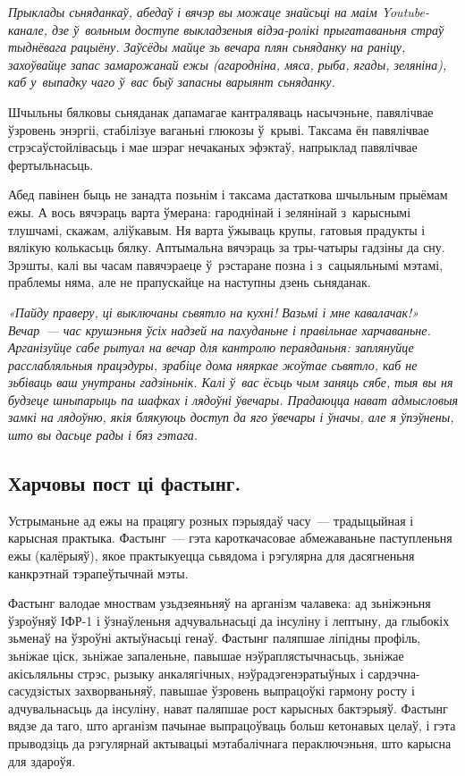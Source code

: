 \emph{Прыклады сьняданкаў, абедаў і вячэр вы можаце знайсьці на маім Youtube-канале, дзе ў~вольным доступе выкладзеныя відэа-ролікі прыгатаваньня страў тыднёвага рацыёну. Заўсёды майце зь вечара плян сьняданку на раніцу, захоўвайце запас замарожанай ежы (агародніна, мяса, рыба, ягады, зеляніна), каб у~выпадку чаго ў~вас быў запасны варыянт сьняданку.}

Шчыльны бялковы сьняданак дапамагае кантраляваць насычэньне, павялічвае ўзровень энэргіі, стабілізуе ваганьні глюкозы ў~крыві. Таксама ён павялічвае стрэсаўстойлівасьць і мае шэраг нечаканых эфэктаў, напрыклад павялічвае фертыльнасьць. 


Абед павінен быць не занадта позьнім і таксама дастаткова шчыльным прыёмам ежы. А вось вячэраць варта ўмерана: гароднінай і зелянінай з~карыснымі тлушчамі, скажам, аліўкавым. Ня варта ўжываць крупы, гатовыя прадукты і вялікую колькасьць бялку. Аптымальна вячэраць за тры-чатыры гадзіны да сну. Зрэшты, калі вы часам павячэраеце ў~рэстаране позна і з~сацыяльнымі мэтамі, праблемы няма, але не прапускайце на наступны дзень сьняданак. 

\emph{«Пайду праверу, ці выключаны сьвятло на кухні! Вазьмі і мне кавалачак!» Вечар~--- час крушэньня ўсіх надзей на пахуданьне і правільнае харчаваньне. Арганізуйце сабе рытуал на вечар для кантролю пераяданьня: заплянуйце расслабляльныя працэдуры, зрабіце дома няяркае жоўтае сьвятло, каб не зьбіваць ваш унутраны гадзіньнік. Калі ў~вас ёсьць чым заняць сябе, тыя вы ня будзеце шныпарыць па шафках і лядоўні ўвечары. Прадаюцца нават адмысловыя замкі на лядоўню, якія блякуюць доступ да яго ўвечары і ўначы, але я ўпэўнены, што вы дасьце рады і бяз гэтага.}

\subsection*{Харчовы пост ці фастынг.}
Устрыманьне ад ежы на працягу розных пэрыядаў часу~--- традыцыйная і карысная практыка. Фастынг~--- гэта кароткачасовае абмежаваньне паступленьня ежы (калёрыяў), якое практыкуецца сьвядома і рэгулярна для дасягненьня канкрэтнай тэрапеўтычнай мэты.

Фастынг валодае мноствам узьдзеяньняў на арганізм чалавека: ад зьніжэньня ўзроўняў ІФР-1 і ўзнаўленьня адчувальнасьці да інсуліну і лептыну, да глыбокіх зьменаў на ўзроўні актыўнасьці генаў. Фастынг паляпшае ліпідны профіль, зьніжае ціск, зьніжае запаленьне, павышае нэўраплястычнасьць, зьніжае акісьляльны стрэс, рызыку анкалягічных, нэўрадэгенэратыўных і сардэчна-сасудзістых захворваньняў, павышае ўзровень выпрацоўкі гармону росту і адчувальнасьць да інсуліну, нават паляпшае рост карысных бактэрыяў. Фастынг вядзе да таго, што арганізм пачынае выпрацоўваць больш кетонавых целаў, і гэта прыводзіць да рэгулярнай актывацыі мэтабалічнага пераключэньня, што карысна для здароўя.

